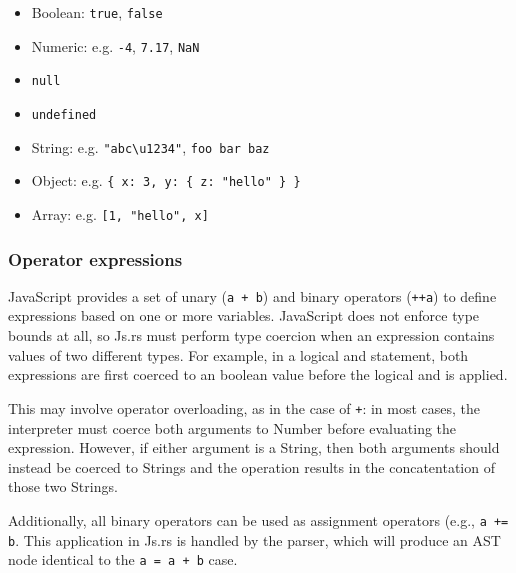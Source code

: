 \documentclass{article}
\begin{document}
\begin{multicols}{2}
\begin{itemize}
  \item Boolean: \texttt{true}, \texttt{false}
  \item Numeric: e.g. \texttt{-4}, \texttt{7.17}, \texttt{NaN}
  \item \texttt{null}
  \item \texttt{undefined}
  \item String: e.g. \texttt{"abc\textbackslash u1234"},
    \texttt{\textquotesingle foo bar baz\textquotesingle}
  \item Object: e.g. \texttt{\{ x: 3, y: \{ z: "hello" \} \} }
  \item Array: e.g. \texttt{[1, "hello", x]}
\end{itemize}

\subsubsection*{Operator expressions}

JavaScript provides a set of unary (\texttt{a + b}) and binary operators
(\texttt{++a}) to define expressions based on one or more variables. JavaScript
does not enforce type bounds at all, so Js.rs must perform type coercion when an
expression contains values of two different types. For example, in a logical
and statement, both expressions are first coerced to an boolean value before the
logical and is applied.\newline

This may involve operator overloading, as in the case of \texttt{+}: in most cases, the
interpreter must coerce both arguments to Number before evaluating the
expression. However, if either argument is a String, then both
arguments should instead be coerced to Strings and the operation results in the
concatentation of those two Strings. \newline

Additionally, all binary operators can be used as assignment operators (e.g.,
\texttt{a += b}. This application in Js.rs is handled by the parser, which will
produce an AST node identical to the \texttt{a = a + b} case.


\end{multicols}
\end{document}
